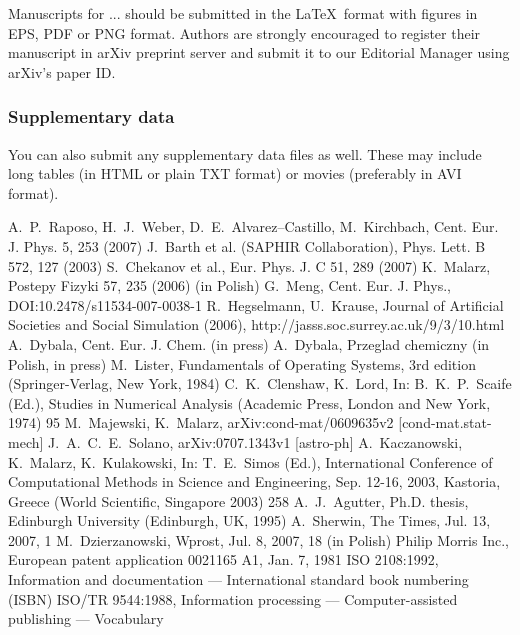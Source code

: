 \documentclass[USenglish,oneside,twocolumn]{article}
\begin{document}
Manuscripts for ... should be submitted in the \LaTeX ~format with figures in EPS, PDF or PNG format. Authors are strongly encouraged to register their manuscript in arXiv preprint server and submit it to our Editorial Manager using arXiv's paper ID.

\subsubsection{Supplementary data}

You can also submit any supplementary data files as well. These may include long tables (in HTML or plain TXT format) or movies (preferably in AVI format).

\begin{thebibliography}{99}
     A.~P.~Raposo, H.~J.~Weber, D.~E.~Alvarez--Castillo, M.~Kirchbach, Cent. Eur. J. Phys. 5, 253 (2007)
     J.~Barth et al. (SAPHIR Collaboration), Phys. Lett. B 572, 127 (2003)
     S.~Chekanov et al., Eur. Phys. J. C 51, 289 (2007)
     K.~Malarz, Postepy Fizyki 57, 235 (2006) (in Polish)
     G.~Meng, Cent. Eur. J. Phys., DOI:10.2478/s11534-007-0038-1
     R.~Hegselmann, U.~Krause, Journal of Artificial Societies and Social Simulation (2006), http://jasss.soc.surrey.ac.uk/9/3/10.html
     A.~Dybala, Cent. Eur. J. Chem. (in press)
     A.~Dybala, Przeglad chemiczny (in Polish, in press)
     M.~Lister, Fundamentals of Operating Systems, 3rd edition (Springer-Verlag, New York, 1984)
     C.~K.~Clenshaw, K.~Lord, In: B.~K.~P.~Scaife (Ed.), Studies in Numerical Analysis (Academic Press, London and New York, 1974) 95
     M.~Majewski, K.~Malarz, arXiv:cond-mat/0609635v2 [cond-mat.stat-mech]
     J.~A.~C.~E.~Solano, arXiv:0707.1343v1 [astro-ph]
     A.~Kaczanowski, K.~Malarz, K.~Kulakowski, In: T.~E.~Simos (Ed.), International Conference of Computational Methods in Science and Engineering, Sep. 12-16, 2003, Kastoria, Greece (World Scientific, Singapore 2003) 258
     A.~J.~Agutter, Ph.D. thesis, Edinburgh University (Edinburgh, UK, 1995)
     A.~Sherwin, The Times, Jul. 13, 2007, 1
     M.~Dzierzanowski, Wprost, Jul. 8, 2007, 18 (in Polish)
     Philip Morris Inc., European patent application 0021165 A1, Jan. 7, 1981
     ISO 2108:1992, Information and documentation --- International standard book numbering (ISBN)
     ISO/TR 9544:1988, Information processing --- Computer-assisted publishing --- Vocabulary
\end{thebibliography}
\end{document}
